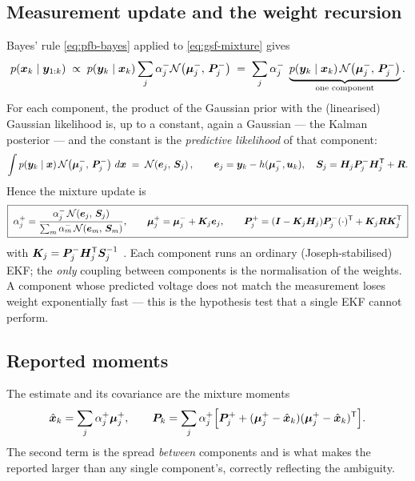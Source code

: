 \subsection{Measurement update and the weight recursion}
Bayes' rule \eqref{eq:pfb-bayes} applied to \eqref{eq:gsf-mixture} gives
\begin{equation}
  p(\bm{x}_k\mid\bm{y}_{1:k}) \;\propto\; p(\bm{y}_k\mid\bm{x}_k)\sum_j \alpha_j^- \mathcal{N}\!\left(\bm\mu_j^-,\,\bm{P}_j^-\right)
  \;=\; \sum_j \alpha_j^-\; \underbrace{p(\bm{y}_k\mid\bm{x}_k)\,\mathcal{N}\!\left(\bm\mu_j^-,\,\bm{P}_j^-\right)}_{\text{one component}} .
  \label{eq:gsf-bayes}
\end{equation}
For each component, the product of the Gaussian prior with the (linearised) Gaussian likelihood is,
up to a constant, again a Gaussian --- the Kalman posterior --- and the constant is the
\emph{predictive likelihood} of that component:
\begin{equation}
  \int p(\bm{y}_k\mid\bm{x})\,\mathcal{N}\!\left(\bm\mu_j^-,\,\bm{P}_j^-\right)\,d\bm{x} \;=\; \mathcal{N}\!\left(\bm e_j,\,\bm{S}_j\right),
  \qquad
  \bm e_j = \bm{y}_k - h(\bm\mu_j^-,\bm{u}_k), \quad \bm{S}_j = \bm{H}_j\bm{P}_j^-\bm{H}_j^{\mathsf{T}} + \bm{R} .
  \label{eq:gsf-predlik}
\end{equation}
Hence the mixture update is
\begin{equation}
  \boxed{\;
  \alpha_j^+ = \frac{\alpha_j^-\, \mathcal{N}\!\left(\bm e_j,\,\bm{S}_j\right)}{\sum_{m}\alpha_m^-\,\mathcal{N}\!\left(\bm e_m,\,\bm{S}_m\right)},
  \qquad
  \bm\mu_j^+ = \bm\mu_j^- + \bm{K}_j\bm e_j, \qquad
  \bm{P}_j^+ = (\bm{I}-\bm{K}_j\bm{H}_j)\bm{P}_j^-(\cdot)^{\mathsf{T}} + \bm{K}_j\bm{R}\bm{K}_j^{\mathsf{T}} \;}
  \label{eq:gsf-update}
\end{equation}
with $\bm{K}_j = \bm{P}_j^-\bm{H}_j^{\mathsf{T}}\bm{S}_j^{-1}$ \cite[eq.~(17)]{alspach1972gsf}.  Each component runs an
ordinary (Joseph-stabilised) EKF; the \emph{only} coupling between components is the normalisation
of the weights.  A component whose predicted voltage does not match the measurement loses weight
exponentially fast --- this is the hypothesis test that a single EKF cannot perform.

\subsection{Reported moments}
The estimate and its covariance are the mixture moments
\begin{equation}
  \hat{\bm{x}}_k = \sum_j \alpha_j^+\bm\mu_j^+, \qquad
  \bm{P}_k = \sum_j \alpha_j^+\Big[\bm{P}_j^+ + (\bm\mu_j^+-\hat{\bm{x}}_k)(\bm\mu_j^+-\hat{\bm{x}}_k)^{\mathsf{T}}\Big].
  \label{eq:gsf-moments}
\end{equation}
The second term is the spread \emph{between} components and is what makes the reported
 larger than any single component's, correctly reflecting the ambiguity.

